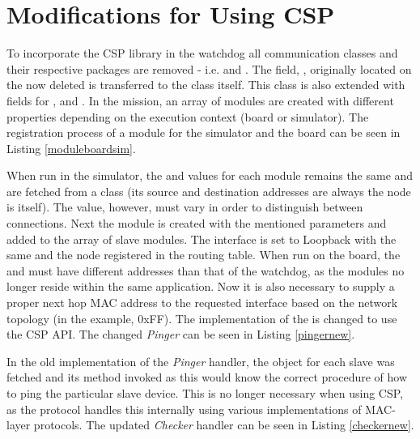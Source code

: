 \section{Modifications for Using CSP}
To incorporate the CSP library in the watchdog all communication classes and their respective packages are removed - i.e.  and . The field, , originally located on the now deleted  is transferred to the  class itself. This class is also extended with fields for ,  and . In the mission, an array of modules are created with different properties depending on the execution context (board or simulator). The registration process of a module for the simulator and the board can be seen in Listing \ref{moduleboardsim}.



When run in the simulator, the  and  values for each module remains the same and are fetched from a  class (its source and destination addresses are always the node is itself). The  value, however, must vary in order to distinguish between connections. Next the module is created with the mentioned parameters and added to the array of slave modules. The interface is set to Loopback with the same  and the node registered in the routing table. When run on the board, the  and  must have different addresses than that of the watchdog, as the modules no longer reside within the same application. Now it is also necessary to supply a proper next hop MAC address to the requested interface based on the network topology (in the example, 0xFF). The implementation of the  is changed to use the CSP API. The changed \textit{Pinger} can be seen in Listing \ref{pingernew}.



In the old implementation of the \textit{Pinger} handler, the  object for each slave was fetched and its  method invoked as this would know the correct procedure of how to ping the particular slave device. This is no longer necessary when using CSP, as the protocol handles this internally using various implementations of MAC-layer protocols. The updated \textit{Checker} handler can be seen in Listing \ref{checkernew}.

